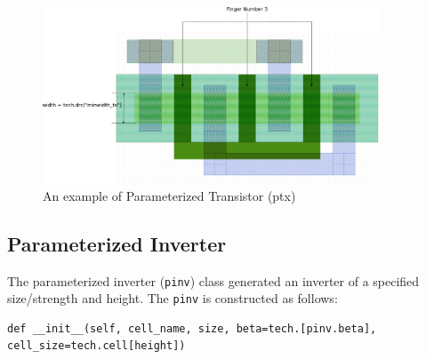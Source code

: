 \begin{figure}[h!]
\centering
\includegraphics[width=10cm]{./figs/ptx.pdf}
\caption{An example of Parameterized Transistor (ptx)}
\label{fig:ptx_example}
\end{figure}



\subsection{Parameterized Inverter}
\label{sec:pinv}

The parameterized inverter (\verb|pinv|) class generated an inverter
of a specified size/strength and height.  The \verb|pinv| is
constructed as follows:
\begin{verbatim}
def __init__(self, cell_name, size, beta=tech.[pinv.beta], 
cell_size=tech.cell[height])
\end{verbatim}

